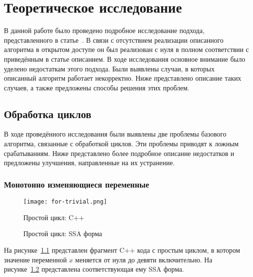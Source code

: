 \chapter{Теоретическое исследование}

В данной работе было проведено подробное исследование подхода,
представленного в статье~\cite{li2010practical}. В связи с отсутствием
реализации описанного алгоритма в открытом доступе он был реализован с
нуля в полном соответствии с приведённым в статье описанием. В ходе
исследования основное внимание было уделено недостаткам этого
подхода. Были выявлены случаи, в которых описанный алгоритм работает
некорректно. Ниже представлено описание таких случаев, а также
предложены способы решения этих проблем.

\section{Обработка циклов}

В ходе проведённого исследования были выявлены две проблемы базового
алгоритма, связанные с обработкой циклов. Эти проблемы приводят к
ложным срабатываниям. Ниже представлено более подробное описание
недостатков и предложены улучшения, направленные на их устранение.

\subsection{Монотонно изменяющиеся переменные}

\begin{figure}
    \texttt{[image: for-trivial.png]}
    \caption{Простой цикл: C++}
    \label{fig:for-trivial-cpp}
\end{figure}

\begin{figure}
    \caption{Простой цикл: SSA форма}
    \label{fig:for-trivial-ssa}
\end{figure}

На рисунке~\ref{fig:for-trivial-cpp} представлен фрагмент C++ кода с
простым циклом, в котором значение переменной $x$ меняется от нуля до
девяти включительно. На рисунке~\ref{fig:for-trivial-ssa} представлена
соответствующая ему SSA форма.

